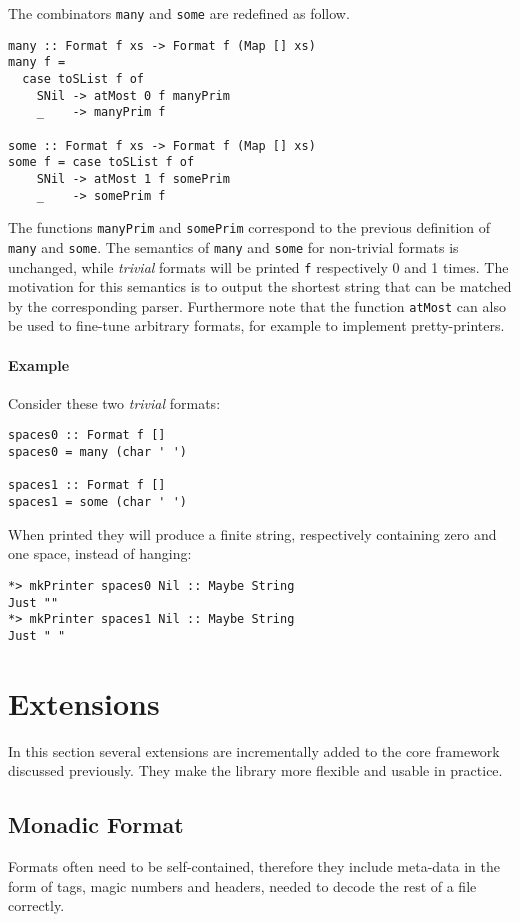 \documentclass[../Thesis.tex]{subfiles}
\begin{document}
The combinators \texttt{many} and \texttt{some} are redefined as follow.
\begin{verbatim}
many :: Format f xs -> Format f (Map [] xs)
many f = 
  case toSList f of
    SNil -> atMost 0 f manyPrim
    _    -> manyPrim f

some :: Format f xs -> Format f (Map [] xs)
some f = case toSList f of
    SNil -> atMost 1 f somePrim
    _    -> somePrim f
\end{verbatim}

The functions \texttt{manyPrim} and \texttt{somePrim} correspond to the previous definition of \texttt{many} and \texttt{some}.
The semantics of \texttt{many} and \texttt{some} for non-trivial formats is unchanged, while \emph{trivial} formats will be printed \texttt{f} respectively 0 and 1 times.
The motivation for this semantics is to output the shortest string that can be matched by the corresponding parser.
Furthermore note that the function \texttt{atMost} can also be used to fine-tune arbitrary formats, for example to implement pretty-printers.

\paragraph{Example}
Consider these two \emph{trivial} formats:
\begin{verbatim}
spaces0 :: Format f []
spaces0 = many (char ' ')

spaces1 :: Format f []
spaces1 = some (char ' ')
\end{verbatim}

When printed they will produce a finite string, respectively containing zero and
one space, instead of hanging:
\begin{verbatim}
*> mkPrinter spaces0 Nil :: Maybe String
Just ""
*> mkPrinter spaces1 Nil :: Maybe String
Just " "
\end{verbatim}

\section{Extensions}
\label{sec:Extensions}
In this section several extensions are incrementally added to the core framework discussed previously. They make the library 
more flexible and usable in practice.

\subsection{Monadic Format}
\label{subsec:Monadic}
Formats often need to be self-contained, therefore they include meta-data in the form of tags, magic numbers and headers, needed to decode the rest of a file correctly. 
\end{document}

